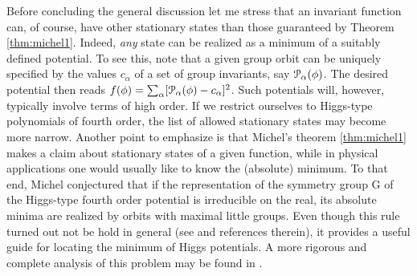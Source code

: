 \documentclass[final,2p,times,12pt,sort&compress]{elsarticle}
\newcommand\gr[1]{\mathrm{#1}}              %
\newcommand\PP{\EuScript{P}}                %
\begin{document}
Before concluding the general discussion let me stress that an invariant
function can, of course, have other stationary states than those guaranteed by
Theorem \ref{thm:michel1}. Indeed, \emph{any} state can be realized as a
minimum of a suitably defined potential. To see this, note that a given group
orbit can be uniquely specified by the values $c_\alpha$ of a set of group
invariants, say $\PP_\alpha(\phi)$. The desired potential then reads
$f(\phi)=\sum_\alpha[\PP_\alpha(\phi)-c_\alpha]^2$. Such potentials will,
however, typically involve terms of high order. If we restrict ourselves to
Higgs-type polynomials of fourth order, the list of allowed stationary states
may become more narrow. Another point to emphasize is that Michel's theorem
\ref{thm:michel1} makes a claim about stationary states of a given function,
while in physical applications one would usually like to know the (absolute)
minimum. To that end, Michel conjectured \cite{Michel:1980pc} that if the
representation of the symmetry group $\gr G$ of the Higgs-type fourth order
potential is irreducible on the real, its absolute minima are realized by orbits
with maximal little groups. Even though this rule turned out not be hold in
general (see \cite{Slansky:1981yr,Meljanac:1985br} and references therein), it
provides a useful guide for locating the minimum of Higgs potentials. A more
rigorous and complete analysis of this problem may be found in
\cite{Abud:1983id}.
\end{document}
